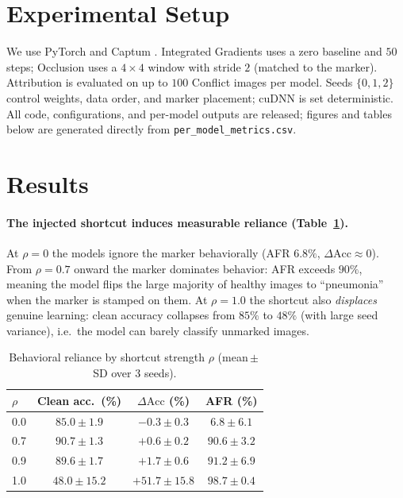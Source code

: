 \documentclass[11pt]{article}
\begin{document}
\section{Experimental Setup}
\label{sec:setup}
We use PyTorch \citep{paszke2019pytorch} and Captum \citep{kokhlikyan2020captum}. Integrated
Gradients uses a zero baseline and $50$ steps; Occlusion uses a $4\times4$ window with stride $2$
(matched to the marker). Attribution is evaluated on up to $100$ Conflict images per model. Seeds
$\{0,1,2\}$ control weights, data order, and marker placement; cuDNN is set deterministic. All code,
configurations, and per-model outputs are released; figures and tables below are generated directly
from \texttt{per\_model\_metrics.csv}.

\section{Results}
\label{sec:results}

\paragraph{The injected shortcut induces measurable reliance (Table~\ref{tab:behavior}).}
At $\rho=0$ the models ignore the marker behaviorally (AFR $6.8\%$, $\Delta\mathrm{Acc}\approx 0$).
From $\rho=0.7$ onward the marker dominates behavior: AFR exceeds $90\%$, meaning the model flips
the large majority of healthy images to ``pneumonia'' when the marker is stamped on them. At
$\rho=1.0$ the shortcut also \emph{displaces} genuine learning: clean accuracy collapses from
$85\%$ to $48\%$ (with large seed variance), i.e.\ the model can barely classify unmarked images.

\begin{table}[t]
\centering
\caption{Behavioral reliance by shortcut strength $\rho$ (mean\,$\pm$\,SD over 3 seeds).}
\label{tab:behavior}
\begin{tabular}{lccc}
\toprule
$\rho$ & Clean acc.\ (\%) & $\Delta\mathrm{Acc}$ (\%) & AFR (\%) \\
\midrule
0.0 & $85.0\pm1.9$ & $-0.3\pm0.3$ & $6.8\pm6.1$ \\
0.7 & $90.7\pm1.3$ & $+0.6\pm0.2$ & $90.6\pm3.2$ \\
0.9 & $89.6\pm1.7$ & $+1.7\pm0.6$ & $91.2\pm6.9$ \\
1.0 & $48.0\pm15.2$ & $+51.7\pm15.8$ & $98.7\pm0.4$ \\
\bottomrule
\end{tabular}
\end{table}
\end{document}
